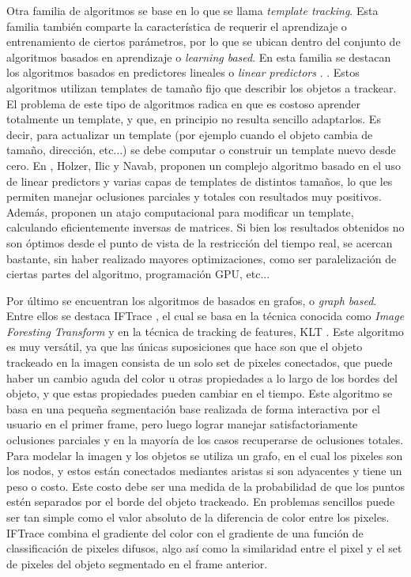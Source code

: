 \documentclass[a4paper,10pt]{article}
\begin{document}
Otra familia de algoritmos se base en lo que se llama \textit{template tracking}. Esta familia también comparte la característica de requerir el aprendizaje o entrenamiento
de ciertos parámetros, por lo que se ubican dentro del conjunto de algoritmos basados en aprendizaje o \textit{learning based}. En esta familia se destacan los algoritmos 
basados en predictores lineales o 
\textit{linear predictors} \cite{alp} \cite{original-linear-predictors}. 
\cite{CITATION NEEDED}. 
Estos algoritmos utilizan templates de tamaño fijo que describir los objetos a trackear. El problema de este tipo de algoritmos radica en que es costoso aprender 
totalmente un template, y que, en principio no resulta sencillo adaptarlos. Es decir, para actualizar un template (por ejemplo cuando el objeto cambia de tamaño, dirección, etc...)
se debe computar o construir un template nuevo desde cero. En \cite{alp}, Holzer, Ilic y Navab, proponen un complejo algoritmo basado en el uso de linear predictors y varias capas
de templates de distintos tamaños, lo que les permiten manejar oclusiones parciales y totales con resultados muy positivos. Además, proponen un atajo computacional para 
modificar un template, calculando eficientemente inversas de matrices. Si bien los resultados obtenidos no son óptimos desde el punto de vista de la restricción del tiempo real, 
se acercan bastante, sin haber realizado mayores optimizaciones, como ser paralelización de ciertas partes del algoritmo, programación GPU, etc...

Por último se encuentran los algoritmos de basados en grafos, o \textit{graph based}. Entre ellos se destaca IFTrace \cite{IFTrace}, el cual se basa en la técnica conocida como 
\textit{Image Foresting Transform} \cite{IFT} y en la técnica de tracking de features, KLT \cite{KLT}. Este algoritmo es muy versátil, ya que las únicas suposiciones que hace son que el objeto trackeado en la imagen consista de un
solo set de pixeles conectados, que puede haber un cambio aguda del color u otras propiedades a lo largo de los bordes del objeto, y que estas propiedades pueden cambiar en el 
tiempo. Este algoritmo se basa en una pequeña segmentación base realizada de forma interactiva por el usuario en el primer frame, pero luego lograr manejar satisfactoriamente
oclusiones parciales y en la mayoría de los casos recuperarse de oclusiones totales. Para modelar la imagen y los objetos se utiliza un grafo, en el cual los pixeles son los nodos, y
estos están conectados mediantes aristas si son adyacentes y tiene un peso o costo. Este costo debe ser una medida de la probabilidad de que los puntos estén separados por el borde del
objeto trackeado. En problemas sencillos puede ser tan simple como el valor absoluto de la diferencia de color entre los pixeles. IFTrace combina el gradiente del color con el 
gradiente de una función de classificación de pixeles difusos, algo así como la similaridad entre el pixel y el set de pixeles del objeto segmentado en el frame anterior. \\
\end{document}
